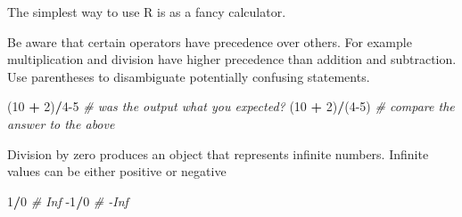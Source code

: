 \documentclass[]{book}
\newenvironment{Shaded}{\begin{snugshade}}{\end{snugshade}}
\newcommand{\CommentTok}[1]{\textcolor[rgb]{0.56,0.35,0.01}{\textit{#1}}}
\newcommand{\DecValTok}[1]{\textcolor[rgb]{0.00,0.00,0.81}{#1}}
\newcommand{\FloatTok}[1]{\textcolor[rgb]{0.00,0.00,0.81}{#1}}
\newcommand{\NormalTok}[1]{#1}
\newcommand{\OperatorTok}[1]{\textcolor[rgb]{0.81,0.36,0.00}{\textbf{#1}}}
\newcommand{\StringTok}[1]{\textcolor[rgb]{0.31,0.60,0.02}{#1}}
\theoremstyle{definition}
\theoremstyle{definition}
\theoremstyle{definition}
\theoremstyle{remark}
\begin{document}
The simplest way to use R is as a fancy calculator.

\begin{Shaded}
\end{Shaded}

Be aware that certain operators have precedence over others. For example
multiplication and division have higher precedence than addition and
subtraction. Use parentheses to disambiguate potentially confusing
statements.

\begin{Shaded}
\begin{Highlighting}[]
\NormalTok{(}\DecValTok{10} \OperatorTok{+}\StringTok{ }\DecValTok{2}\NormalTok{)}\OperatorTok{/}\DecValTok{4-5}   \CommentTok{# was the output what you expected?}
\NormalTok{(}\DecValTok{10} \OperatorTok{+}\StringTok{ }\DecValTok{2}\NormalTok{)}\OperatorTok{/}\NormalTok{(}\DecValTok{4-5}\NormalTok{) }\CommentTok{# compare the answer to the above}
\end{Highlighting}
\end{Shaded}

Division by zero produces an object that represents infinite numbers.
Infinite values can be either positive or negative

\begin{Shaded}
\begin{Highlighting}[]
\DecValTok{1}\OperatorTok{/}\DecValTok{0}  \CommentTok{# Inf}
\DecValTok{-1}\OperatorTok{/}\DecValTok{0} \CommentTok{# -Inf}
\end{Highlighting}
\end{Shaded}
\end{document}
